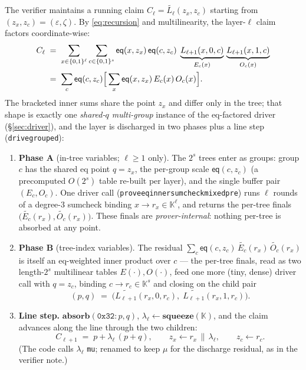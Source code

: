 \documentclass[11pt]{article}
\newcommand{\K}{\mathbb{K}}            %
\newcommand{\bits}{\{0,1\}}
\newcommand{\mle}[1]{\widetilde{#1}}
\newcommand{\eq}{\mathsf{eq}}
\newcommand{\code}[1]{{\def\_{\textunderscore\allowbreak}\texttt{#1}}}
\theoremstyle{definition}
\begin{document}
The verifier maintains a running claim $C_\ell = \mle{L_\ell}(z_x, z_c)$
starting from $(z_x, z_c) = (\varepsilon, \zeta)$.  By
\eqref{eq:recursion} and multilinearity, the layer-$\ell$ claim factors
coordinate-wise:
\begin{align}
  C_\ell
  \;&=\; \sum_{x \in \bits^\ell}\sum_{c \in \bits^s}
        \eq(x, z_x)\,\eq(c, z_c)\;
        \underbrace{L_{\ell+1}(x,0,c)}_{E_c(x)}\,
        \underbrace{L_{\ell+1}(x,1,c)}_{O_c(x)} \notag\\
  \;&=\; \sum_{c} \eq(c, z_c)
        \Big[\sum_{x} \eq(x, z_x)\, E_c(x)\, O_c(x)\Big].
        \label{eq:layer}
\end{align}
The bracketed inner sums share the point $z_x$ and differ only in the
tree; that shape is exactly one \emph{shared-$q$ multi-group} instance
of the eq-factored driver (\S\ref{sec:driver}), and the layer is
discharged in two phases plus a line step
(\code{drive\_grouped}):

\begin{enumerate}[leftmargin=2.2em, itemsep=2pt]
\item \textbf{Phase A} (in-tree variables; $\ell \ge 1$ only).  The
  $2^s$ trees enter as groups: group $c$ has the shared eq point
  $q = z_x$, the per-group scale $\eq(c, z_c)$ (a precomputed
  $O(2^s)$ table re-built per layer), and the single buffer pair
  $(E_c, O_c)$.  One driver call
  (\code{prove\_eq\_inner\_sumcheck\_mixed\_pre}) runs $\ell$ rounds of
  a degree-3 sumcheck binding $x \to r_x \in \K^\ell$, and returns the
  per-tree finals
  $\big(\mle{E_c}(r_x), \mle{O_c}(r_x)\big)$.  These finals are
  \emph{prover-internal}: nothing per-tree is absorbed at any point.
\item \textbf{Phase B} (tree-index variables).  The residual
  $\sum_c \eq(c, z_c)\,\mle{E_c}(r_x)\,\mle{O_c}(r_x)$ is itself an
  eq-weighted inner product over $c$ --- the per-tree finals, read as
  two length-$2^s$ multilinear tables $E(\cdot), O(\cdot)$, feed one
  more (tiny, dense) driver call with $q = z_c$, binding
  $c \to r_c \in \K^s$ and closing on the child pair
  \[
    (p, q) \;=\;
    \big(\mle{L_{\ell+1}}(r_x, 0, r_c),\;
         \mle{L_{\ell+1}}(r_x, 1, r_c)\big).
  \]
\item \textbf{Line step.}  $\textbf{absorb}(\mathtt{0x32}: p, q)$,
  $\lambda_\ell \leftarrow \textbf{squeeze}(\K)$, and the claim advances
  along the line through the two children:
  \[
    C_{\ell+1} \;=\; p + \lambda_\ell\,(p + q), \qquad
    z_x \leftarrow r_x\,\|\,\lambda_\ell, \qquad
    z_c \leftarrow r_c .
  \]
  (The code calls $\lambda_\ell$ \code{mu}; renamed to keep $\mu$ for
  the discharge residual, as in the verifier note.)
\end{enumerate}
\end{document}
